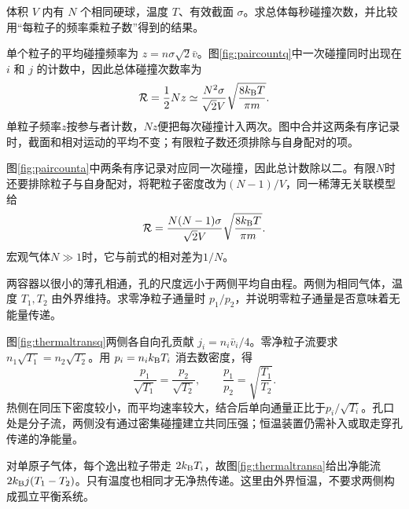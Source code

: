 \begin{exercise}[同种气体的碰撞计数]
体积 $V$ 内有 $N$ 个相同硬球，温度 $T$、有效截面 $\sigma$。求总体每秒碰撞次数，并比较用“每粒子的频率乘粒子数”得到的结果。
\end{exercise}
\begin{solution}
单个粒子的平均碰撞频率为 $z=n\sigma\sqrt2\bar v$。图\ref{fig:paircountq}中一次碰撞同时出现在 $i$ 和 $j$ 的计数中，因此总体碰撞次数率为
\[
\mathcal R=\frac12Nz\simeq\frac{N^2\sigma}{\sqrt2V}\sqrt{\frac{8k_{\mathrm B} T}{\pi m}}.
\]
单粒子频率$z$按参与者计数，$Nz$便把每次碰撞计入两次。图中合并这两条有序记录时，截面和相对运动的平均不变；有限粒子数还须排除与自身配对的项。

图\ref{fig:paircounta}中两条有序记录对应同一次碰撞，因此总计数除以二。有限$N$时还要排除粒子与自身配对，将靶粒子密度改为$(N-1)/V$，同一稀薄无关联模型给
\[\mathcal R=\frac{N(N-1)\sigma}{\sqrt2V}
\sqrt{\frac{8k_{\mathrm B} T}{\pi m}}.\]
宏观气体$N\gg1$时，它与前式的相对差为$1/N$。
\end{solution}

\begin{exercise}[小孔两侧的平衡条件]
两容器以很小的薄孔相通，孔的尺度远小于两侧平均自由程。两侧为相同气体，温度 $T_1,T_2$ 由外界维持。求零净粒子通量时 $p_1/p_2$，并说明零粒子通量是否意味着无能量传递。
\end{exercise}
\begin{solution}
图\ref{fig:thermaltransq}两侧各自向孔贡献 $j_i=n_i\bar v_i/4$。零净粒子流要求 $n_1\sqrt{T_1}=n_2\sqrt{T_2}$。用 $p_i=n_ik_{\mathrm B} T_i$ 消去数密度，得
\[
 \frac{p_1}{\sqrt{T_1}}=\frac{p_2}{\sqrt{T_2}},\qquad
 \frac{p_1}{p_2}=\sqrt{\frac{T_1}{T_2}}.
\]
热侧在同压下密度较小，而平均速率较大，结合后单向通量正比于$p_i/\sqrt{T_i}$。孔口处是分子流，两侧没有通过密集碰撞建立共同压强；恒温装置仍需补入或取走穿孔传递的净能量。

对单原子气体，每个逸出粒子带走 $2k_{\mathrm B} T_i$，故图\ref{fig:thermaltransa}给出净能流 $2k_{\mathrm B} j(T_1-T_2)$。只有温度也相同才无净热传递。这里由外界恒温，不要求两侧构成孤立平衡系统。
\end{solution}

